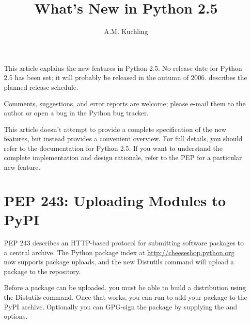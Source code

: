 \documentclass{howto}
\title{What's New in Python 2.5}
\author{A.M. Kuchling}
\begin{document}
\maketitle
\tableofcontents

This article explains the new features in Python 2.5.  No release date
for Python 2.5 has been set; it will probably be released in the
autumn of 2006.   describes the planned release schedule.

Comments, suggestions, and error reports are welcome; please e-mail them 
to the author or open a bug in the Python bug tracker.


This article doesn't attempt to provide a complete specification of
the new features, but instead provides a convenient overview.  For
full details, you should refer to the documentation for Python 2.5.
If you want to understand the complete implementation and design
rationale, refer to the PEP for a particular new feature.


\section{PEP 243: Uploading Modules to PyPI\label{pep-243}}

PEP 243 describes an HTTP-based protocol for submitting software
packages to a central archive.  The Python package index at
\url{http://cheeseshop.python.org} now supports package uploads, and
the new  Distutils command will upload a package to the
repository.

Before a package can be uploaded, you must be able to build a
distribution using the  Distutils command.  Once that
works, you can run  to add your package
to the PyPI archive.  Optionally you can GPG-sign the package by
supplying the  and
 options.

\begin{seealso}


\end{seealso}
\end{document}

